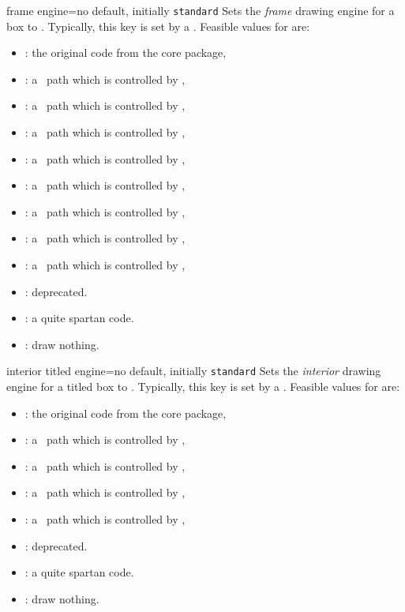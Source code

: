 \begin{docTcbKey}{frame engine}{=}{no default, initially \texttt{standard}}
  Sets the \emph{frame} drawing engine for a box to .
  Typically, this key is set by a .
  Feasible values for  are:
  \begin{itemize}
  \item{}: the original code from the core package,
  \item{}: a \tikzname\ path which is controlled by ,
  \item{}: a \tikzname\ path which is controlled by ,
  \item{}: a \tikzname\ path which is controlled by ,
  \item{}: a \tikzname\ path which is controlled by ,
  \item{}: a \tikzname\ path which is controlled by ,
  \item{}: a \tikzname\ path which is controlled by ,
  \item{}: a \tikzname\ path which is controlled by ,
  \item{}: a \tikzname\ path which is controlled by ,
  \item{}: deprecated.
  \item{}: a quite spartan code.
  \item{}: draw nothing.
\end{itemize}
\end{docTcbKey}

\begin{docTcbKey}{interior titled engine}{=}{no default, initially \texttt{standard}}
  Sets the \emph{interior} drawing engine for a titled box to .
  Typically, this key is set by a .
  Feasible values for  are:
  \begin{itemize}
  \item{}: the original code from the core package,
  \item{}: a \tikzname\ path which is controlled by ,
  \item{}: a \tikzname\ path which is controlled by ,
  \item{}: a \tikzname\ path which is controlled by ,
  \item{}: a \tikzname\ path which is controlled by ,
  \item{}: deprecated.
  \item{}: a quite spartan code.
  \item{}: draw nothing.
  \end{itemize}
\end{docTcbKey}

